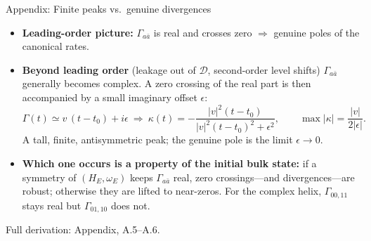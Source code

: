\documentclass[aspectratio=169,11pt]{beamer}
\newcommand{\appref}[1]{{\color{muted}\footnotesize Full derivation: Appendix, #1.}}
\newcommand{\ongoing}{{\color{muted}\footnotesize Ongoing analysis.}}
\begin{document}
\begin{frame}{Appendix: Finite peaks vs.\ genuine divergences}
\small
\begin{itemize}\setlength\itemsep{6pt}
\item \textbf{Leading-order picture:} $\Gamma_{a\bar a}$ is real and crosses zero $\Rightarrow$ genuine poles of the canonical rates.
\item \textbf{Beyond leading order} (leakage out of $\mathcal D$, second-order level shifts) $\Gamma_{a\bar a}$ generally becomes complex. A zero crossing of the real part is then accompanied by a small imaginary offset $\epsilon$:
\[
\Gamma(t)\simeq v\,(t-t_0)+i\epsilon\ \Longrightarrow\
\kappa(t)=-\frac{\lvert v\rvert^2(t-t_0)}{\lvert v\rvert^2(t-t_0)^2+\epsilon^2},\qquad
\max\lvert\kappa\rvert=\frac{\lvert v\rvert}{2\lvert\epsilon\rvert}.
\]
A tall, finite, antisymmetric peak; the genuine pole is the limit $\epsilon\to0$.
\item \textbf{Which one occurs is a property of the initial bulk state:} if a symmetry of $(H_E,\omega_E)$ keeps $\Gamma_{a\bar a}$ real, zero crossings---and divergences---are robust; otherwise they are lifted to near-zeros. For the complex helix, $\Gamma_{00,11}$ stays real but $\Gamma_{01,10}$ does not.
\end{itemize}
\medskip
\begin{center}
\end{center}
\appref{A.5--A.6}\quad \ongoing
\end{frame}
\end{document}
